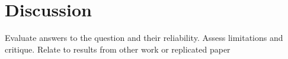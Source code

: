 \chapter{Discussion}
\label{sec:discussion}

Evaluate answers to the question and their reliability. Assess limitations and critique. Relate to results from other work or replicated paper